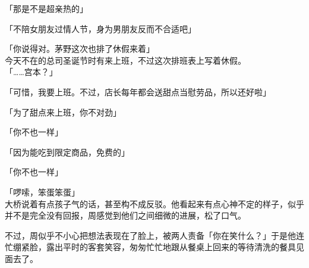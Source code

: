 「那是不是超亲热的」

「不陪女朋友过情人节，身为男朋友反而不合适吧」

「你说得对。茅野这次也排了休假来着」\\

今天不在的总司圣诞节时有来上班，不过这次排班表上写着休假。\\

「……宫本？」

「可惜，我要上班。不过，店长每年都会送甜点当慰劳品，所以还好啦」

「为了甜点来上班，你不对劲」

「你不也一样」

「因为能吃到限定商品，免费的」

「你不也一样」

「啰嗦，笨蛋笨蛋」\\

大桥说着有点孩子气的话，甚至构不成反驳。他看起来有点心神不定的样子，似乎并不是完全没有回报，周感觉到他们之间细微的进展，松了口气。

不过，周似乎不小心把想法表现在了脸上，被两人责备「你在笑什么？」于是他连忙绷紧脸，露出平时的客套笑容，匆匆忙忙地跟从餐桌上回来的等待清洗的餐具见面去了。
